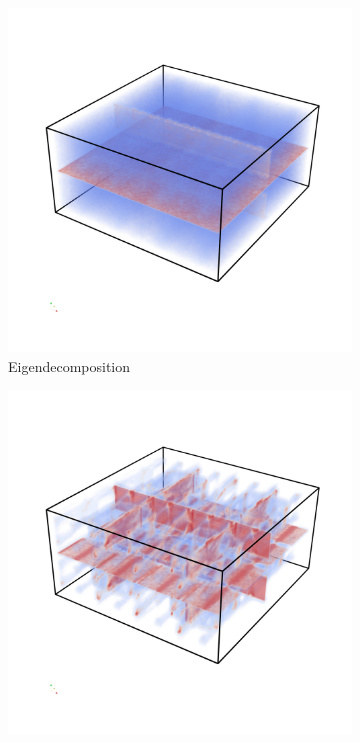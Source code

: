 \begin{figure}[t]
    \begin{subfigure}[b]{0.49\textwidth}
        \includegraphics[trim=0 350 0 300, clip=true, width=\textwidth]{Images/shiftXold.png}
        \caption{Eigendecomposition}
        \label{fig:MCeigen}
    \end{subfigure}
    \begin{subfigure}[b]{0.49\textwidth}
        \includegraphics[trim=0 350 0 300, clip=true, width=\textwidth]{Images/shiftXoldchol.png}

\end{subfigure}
\end{figure}
